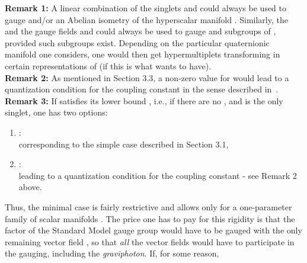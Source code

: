 \documentclass[a4paper,11pt]{article}
\providecommand{\M}{\ensuremath{\mathcal{M}}}
\begin{document}
\noindent\textbf{Remark 1:} A linear combination of the \coordHE{} 
singlets \coordHE{} and 
\coordHE{} could always be used to gauge \coordHE{} and/or
an Abelian isometry of the hyperscalar manifold \myHighlight{$\M_{VS}$}\coordHE{}.
Similarly, the \coordHE{} and the \coordHE{} gauge fields \coordHE{}
and \coordHE{} could always be used to gauge \coordHE{} and \coordHE{}
subgroups of \myHighlight{$Iso(\M_{Q})$}\coordHE{}, provided such subgroups exist. Depending on 
the particular quaternionic manifold one considers, one would then 
get hypermultiplets transforming in certain representations of
\coordHE{} (if this is what wants to have).\\
\textbf{Remark 2:} As mentioned in Section 3.3, a non-zero value 
for \coordHE{} would lead to a 
quantization condition for the \coordHE{} coupling constant in the sense 
described in~\cite{GST1.5}.\\
\textbf{Remark 3:} If \coordHE{} satisfies its lower bound \coordHE{}, i.e.,
if there are no \coordHE{}, and \coordHE{} is the only 
\coordHE{} singlet, one has two options:
\begin{enumerate}
\item {}\coordHE{}:\\
corresponding to the simple case \coordHE{} described in
Section 3.1,
\item {}\coordHE{}:\\
leading to a quantization condition for the \coordHE{} coupling
constant - see Remark 2 above.
\end{enumerate}
Thus, the minimal case \coordHE{} is fairly restrictive and allows only for  
a one-parameter family of scalar manifolds \myHighlight{$\M_{VS}$}\coordHE{}. 
The price one has to pay for this rigidity
is that the \coordHE{} factor of the Standard Model gauge group 
would have to be gauged with the only remaining vector field \coordHE{},
so that \emph{all} the vector fields would have to participate in the 
gauging, including the \emph{graviphoton}. If, for some reason, 
\end{document}
